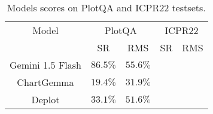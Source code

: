 \begin{table}
 \begin{tabular}{ |c|c|c|c|c|}
 Model & \multicolumn{2}{|c|}{PlotQA} & \multicolumn{2}{|c|}{ICPR22} \\
 & SR & RMS & SR & RMS \\
 Gemini 1.5 Flash & $86.5\%$ & $55.6\%$ & & \\
 ChartGemma & $19.4\%$ & $31.9\%$ & & \\
 Deplot & $33.1\%$ & $51.6\%$ & &  \\
 \end{tabular}
 \caption{Models scores on PlotQA and ICPR22 testsets.}
 \label{tab:final-scores}
  \end{table}
